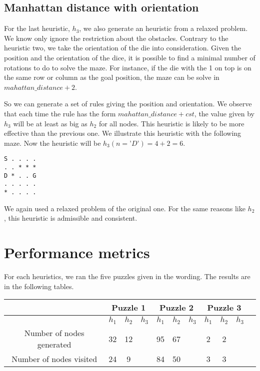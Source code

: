 \documentclass[]{article}
\begin{document}
\subsection{Manhattan distance with orientation}
For the last heuristic, $h_3$, we also generate an heuristic from a relaxed problem.
We know only ignore the restriction about the obstacles.
Contrary to the heuristic two, we take the orientation of the die into consideration.
Given the position and the orientation of the dice, it is possible to find a minimal number of rotations to do to solve the maze.
For instance, if the die with the 1 on top is on the same row or column as the goal position, the maze can be solve in $mahattan\_distance + 2$.

So we can generate a set of rules giving the position and orientation.
We observe that each time the rule has the form  $mahattan\_distance + cst$, the value given by $h_3$ will be at least as big as $h_2$ for all nodes.
This heuristic is likely to be more effective than the previous one.
We illustrate this heuristic with the following maze.
Now the heuristic will be $h_3(n=’D’) = 4 + 2 = 6$.

\begin{lstlisting}
S . . . .
. . * * *
D * . . G
. . . . .
* . . . .
\end{lstlisting}

We again used a relaxed problem of the original one.
For the same reasons like $h_2$, this heuristic is admissible and consistent.

\section{Performance metrics}

For each heuristics, we ran the five puzzles given in the wording.
The results are in the following tables.

\begin{center}
    \begin{tabular}{| c | c | c | c | c | c | c | c | c | c | c |}
      \cline{2-10} & \multicolumn{3}{|c|}{Puzzle 1} & \multicolumn{3}{|c|}{Puzzle 2} & \multicolumn{3}{|c|}{Puzzle 3} \\
      \hline
    & $h_1$ & $h_2$ & $h_3$ & $h_1$ & $h_2$& $h_3$ & $h_1$ &  $h_2$ & $h_3$ \\ \hline
    Number of nodes generated & 32 & 12 &  & 95 & 67 &  & 2 & 2 & \\ \hline
    Number of nodes visited   & 24 & 9  &  & 84 & 50 &  & 3 & 3 & \\ \hline
    \end{tabular}
\end{center}
\end{document}
